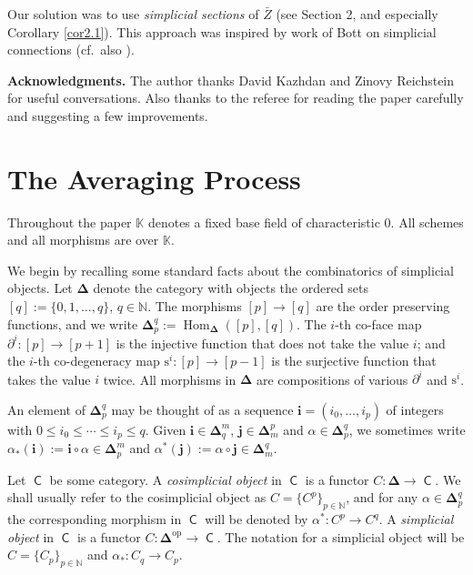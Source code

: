 \documentclass[10pt]{amsart}
\theoremstyle{definition}
\numberwithin{equation}{section}
\newcommand{\opn}{\operatorname}
\newcommand{\cat}[1]{\operatorname{\mathsf{#1}}}
\newcommand{\mrm}[1]{\mathrm{#1}}
\newcommand{\mbb}[1]{\mathbb{#1}}
\newcommand{\bsym}[1]{\boldsymbol{#1}}
\newcommand{\set}[1]{\{ #1 \}}
\newcommand{\K}{\mbb{K}}
\begin{document}
Our solution was to use {\em simplicial sections} of $\bar{Z}$
(see Section 2, and especially Corollary \ref{cor2.1}). This 
approach was inspired by work of Bott \cite{Bo} on simplicial 
connections (cf.\ also \cite{HY}). 



\medskip \noindent
\textbf{Acknowledgments.} 
The author thanks David Kazhdan and Zinovy Reichstein for useful 
conversations. Also thanks to the referee for reading the paper 
carefully and suggesting a few improvements.




\section{The Averaging Process}
\label{sec1}

Throughout the paper $\K$ denotes a fixed base field of 
characteristic $0$. All schemes and all morphisms are over $\K$.

We begin by recalling some standard facts about the combinatorics
of simplicial objects. 
Let $\bsym{\Delta}$ denote the category with objects the ordered 
sets $[q] := \{ 0, 1, \ldots, q \}$, $q \in \mbb{N}$. The 
morphisms $[p] \to [q]$ are the order preserving functions,
and we write
$\bsym{\Delta}^q_p := \opn{Hom}_{\bsym{\Delta}}([p], [q])$. 
The $i$-th co-face map 
$\partial^i : [p] \to [p + 1]$
is the injective function that does not take the value $i$;
and the $i$-th co-degeneracy map
$\mrm{s}^i : [p] \to [p - 1]$
is the surjective function that takes the value $i$ twice.
All morphisms in $\bsym{\Delta}$ are compositions of various 
$\partial^i$ and $\mrm{s}^i$. 

An element of $\bsym{\Delta}^q_p$ may be thought of as a sequence
$\bsym{i} = (i_0, \ldots, i_p)$ of integers with
$0 \leq i_0 \leq \cdots \leq i_p \leq q$. 
Given $\bsym{i} \in \bsym{\Delta}^m_q$, 
$\bsym{j} \in \bsym{\Delta}_m^p$ and
$\alpha \in \bsym{\Delta}^q_p$, 
we sometimes write 
$\alpha_*(\bsym{i}) := \bsym{i} \circ \alpha \in \bsym{\Delta}^m_p$ 
and 
$\alpha^*(\bsym{j}) := \alpha  \circ\bsym{j} \in 
\bsym{\Delta}_m^q$.

Let $\cat{C}$ be some category. A {\em cosimplicial object} in 
$\cat{C}$ is a functor $C : \bsym{\Delta} \to \cat{C}$.
We shall usually refer to the cosimplicial object as
$C = \set{C^p}_{p \in \mbb{N}}$,
and for any $\alpha \in \bsym{\Delta}_p^q$ the corresponding 
morphism in $\cat{C}$ will be denoted by 
$\alpha^* : C^p \to C^q$.
A {\em simplicial object} in 
$\cat{C}$ is a functor $C : \bsym{\Delta}^{\mrm{op}} \to \cat{C}$.
The notation for a simplicial object
will be $C = \set{C_p}_{p \in \mbb{N}}$ and
$\alpha_* : C_q \to C_p$.
\end{document}
